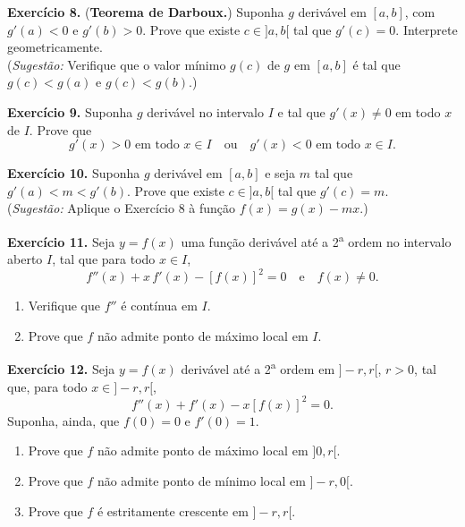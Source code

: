 \documentclass[12pt,a4paper]{article}
\begin{document}
\vspace{0.5cm}
\noindent\textbf{Exercício 8.} (\textbf{Teorema de Darboux.}) Suponha $g$ derivável em $[a, b]$, com $g'(a) < 0$ e $g'(b) > 0$. Prove que existe $c \in {]a, b[}$ tal que $g'(c) = 0$. Interprete geometricamente.\\
(\textit{Sugestão:} Verifique que o valor mínimo $g(c)$ de $g$ em $[a, b]$ é tal que $g(c) < g(a)$ e $g(c) < g(b)$.)

\vspace{0.5cm}
\noindent\textbf{Exercício 9.} Suponha $g$ derivável no intervalo $I$ e tal que $g'(x) \neq 0$ em todo $x$ de $I$. Prove que
\[
g'(x) > 0 \text{ em todo } x \in I \quad\text{ou}\quad g'(x) < 0 \text{ em todo } x \in I.
\]

\vspace{0.5cm}
\noindent\textbf{Exercício 10.} Suponha $g$ derivável em $[a, b]$ e seja $m$ tal que $g'(a) < m < g'(b)$. Prove que existe $c \in {]a, b[}$ tal que $g'(c) = m$.\\
(\textit{Sugestão:} Aplique o Exercício 8 à função $f(x) = g(x) - mx$.)

\vspace{0.5cm}
\noindent\textbf{Exercício 11.} Seja $y = f(x)$ uma função derivável até a 2\textsuperscript{a} ordem no intervalo aberto $I$, tal que para todo $x \in I$,
\[
f''(x) + x\,f'(x) - [f(x)]^2 = 0 \quad\text{e}\quad f(x) \neq 0.
\]
\begin{enumerate}
    \renewcommand{\theenumi}{\alph{enumi}}
    \renewcommand{\labelenumi}{\theenumi)}
    \item Verifique que $f''$ é contínua em $I$.
    \item Prove que $f$ não admite ponto de máximo local em $I$.
\end{enumerate}

\vspace{0.5cm}
\noindent\textbf{Exercício 12.} Seja $y = f(x)$ derivável até a 2\textsuperscript{a} ordem em ${]-r, r[}$, $r > 0$, tal que, para todo $x \in {]-r, r[}$,
\[
f''(x) + f'(x) - x[f(x)]^2 = 0.
\]
Suponha, ainda, que $f(0) = 0$ e $f'(0) = 1$.
\begin{enumerate}
    \renewcommand{\theenumi}{\alph{enumi}}
    \renewcommand{\labelenumi}{\theenumi)}
    \item Prove que $f$ não admite ponto de máximo local em ${]0, r[}$.
    \item Prove que $f$ não admite ponto de mínimo local em ${]-r, 0[}$.
    \item Prove que $f$ é estritamente crescente em ${]-r, r[}$.
\end{enumerate}
\end{document}
